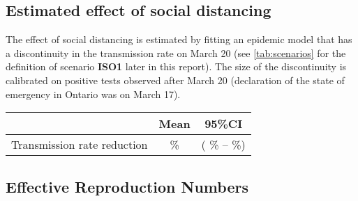 \documentclass[10pt]{article}
\newcommand{\scen}[1]{\textbf{\textsf{#1}}}
\begin{document}
%
%


\subsection*{Estimated effect of social distancing}


The effect of social distancing is estimated by fitting an epidemic model that has a discontinuity in the transmission rate on March 20 (see \autoref{tab:scenarios} for the definition of scenario \scen{ISO1} later in this report). The size of the discontinuity is calibrated on positive tests observed after March 20 (declaration of the state of emergency in Ontario was on March 17). 

\renewcommand{\arraystretch}{1.5}
\begin{table}[h!]
\begin{center}
\begin{tabular}{lc c}
\hline
\bf  & \bf Mean & \bf 95\%CI \\
\hline


Transmission rate reduction & 
\%&
( \% --
\%)\\


\hline
\end{tabular}
\end{center}
\end{table}



\newpage

\subsection*{Effective Reproduction Numbers}
\end{document}
